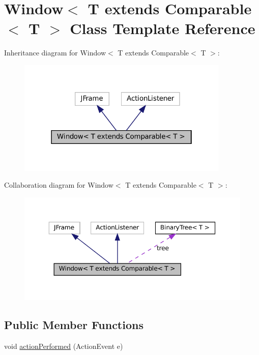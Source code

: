\hypertarget{classWindow}{}\section{Window$<$ T extends Comparable$<$ T $>$ Class Template Reference}
\label{classWindow}


Inheritance diagram for Window$<$ T extends Comparable$<$ T $>$\+:
\nopagebreak
\begin{figure}[H]
\begin{center}
\leavevmode
\includegraphics[width=286pt]{classWindow__inherit__graph}
\end{center}
\end{figure}


Collaboration diagram for Window$<$ T extends Comparable$<$ T $>$\+:
\nopagebreak
\begin{figure}[H]
\begin{center}
\leavevmode
\includegraphics[width=350pt]{classWindow__coll__graph}
\end{center}
\end{figure}
\subsection*{Public Member Functions}
\begin{DoxyCompactItemize}
\item 
void \hyperlink{classWindow_aa0461cd99d9f9019c64d5e68dad1bead}{action\+Performed} (Action\+Event e)
\end{DoxyCompactItemize}


